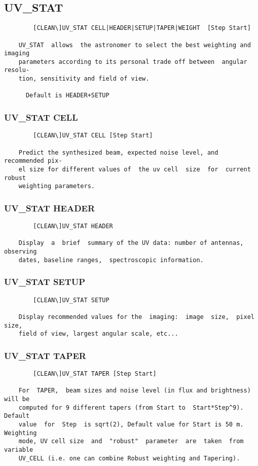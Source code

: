 \subsection{UV\_STAT}
\begin{verbatim}
        [CLEAN\]UV_STAT CELL|HEADER|SETUP|TAPER|WEIGHT  [Step Start]

    UV_STAT  allows  the astronomer to select the best weighting and imaging
    parameters according to its personal trade off between  angular  resolu-
    tion, sensitivity and field of view.

      Default is HEADER+SETUP

\end{verbatim}
\subsubsection{UV\_STAT CELL}
\begin{verbatim}
        [CLEAN\]UV_STAT CELL [Step Start]

    Predict the synthesized beam, expected noise level, and recommended pix-
    el size for different values of  the uv cell  size  for  current  robust
    weighting parameters.

\end{verbatim}
\subsubsection{UV\_STAT HEADER}
\begin{verbatim}
        [CLEAN\]UV_STAT HEADER

    Display  a  brief  summary of the UV data: number of antennas, observing
    dates, baseline ranges,  spectroscopic information.

\end{verbatim}
\subsubsection{UV\_STAT SETUP}
\begin{verbatim}
        [CLEAN\]UV_STAT SETUP

    Display recommended values for the  imaging:  image  size,  pixel  size,
    field of view, largest angular scale, etc...

\end{verbatim}
\subsubsection{UV\_STAT TAPER}
\begin{verbatim}
        [CLEAN\]UV_STAT TAPER [Step Start]

    For  TAPER,  beam sizes and noise level (in flux and brightness) will be
    computed for 9 different tapers (from Start to  Start*Step^9).   Default
    value  for  Step  is sqrt(2), Default value for Start is 50 m. Weighting
    mode, UV cell size  and  "robust"  parameter  are  taken  from  variable
    UV_CELL (i.e. one can combine Robust weighting and Tapering).

\end{verbatim}
